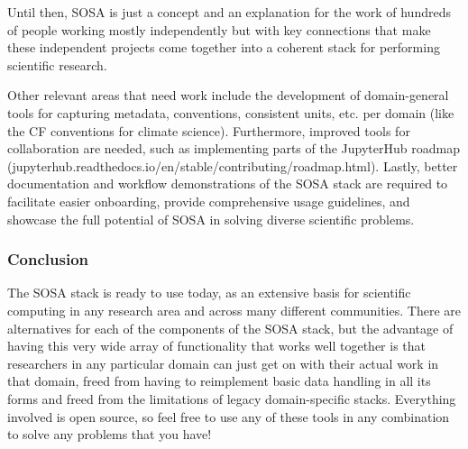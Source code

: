 Until then, SOSA is just a concept and an explanation for the work of hundreds of people working mostly independently but with key connections that make these independent projects come together into a coherent stack for performing scientific research.

Other relevant areas that need work include the development of domain-general tools for capturing metadata, conventions, consistent units, etc. per domain (like the CF conventions for climate science). Furthermore, improved tools for collaboration are needed, such as implementing parts of the JupyterHub roadmap (jupyterhub.readthedocs.io/en/stable/contributing/roadmap.html). Lastly, better documentation and workflow demonstrations of the SOSA stack are required to facilitate easier onboarding, provide comprehensive usage guidelines, and showcase the full potential of SOSA in solving diverse scientific problems.


\subsubsection{Conclusion}

The SOSA stack is ready to use today, as an extensive basis for scientific computing in any research area and across many different communities. There are alternatives for each of the components of the SOSA stack, but the advantage of having this very wide array of functionality that works well together is that researchers in any particular domain can just get on with their actual work in that domain, freed from having to reimplement basic data handling in all its forms and freed from the limitations of legacy domain-specific stacks. Everything involved is open source, so feel free to use any of these tools in any combination to solve any problems that you have!
